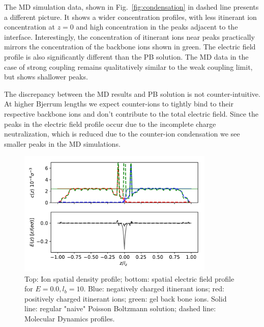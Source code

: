 \documentclass[twoside,twocolumn,9pt]{article}
\begin{document}
The MD simulation data, shown in Fig.~\ref{fig:condensation} in dashed line presents a different picture. It shows a wider concentration profiles, with less itinerant ion concentration at $z=0$ and high concentration in the peaks adjacent to the interface. Interestingly, the concentration of itinerant ions near peaks practically mirrors the concentration of the backbone ions shown in green. The electric field profile  is also significantly different than the PB solution. The MD data in the case of strong coupling remains qualitatively similar to the weak coupling limit, but shows  shallower peaks. 

The discrepancy between the MD results and PB solution is not counter-intuitive. At higher Bjerrum lengths we expect counter-ions to tightly bind to their respective backbone ions and don't contribute to the total electric field. Since the peaks in the electric field profile occur due to the incomplete charge neutralization, which is reduced due to the counter-ion condensation we see smaller peaks in the MD simulations.



\begin{figure}[h]
\centering
  \includegraphics[height=6cm]{fig/Compare_E00_lb10.pdf}
  \caption{Top: Ion spatial density profile; bottom: spatial electric field profile for $E=0.0, l_b=10$. Blue: negatively charged itinerant ions; red: positively charged itinerant ions; green: gel back bone ions. Solid line: regular "naive" Poisson Boltzmann solution; dashed line: Molecular Dynamics profiles.}
  \label{fig:e0_lb10}
\end{figure}
\end{document}
